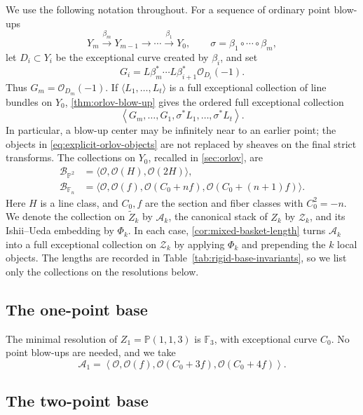 \documentclass[11pt]{article}
\theoremstyle{plain}
\theoremstyle{definition}
\theoremstyle{remark}
\newcommand{\Pp}{\mathbb P}
\newcommand{\F}{\mathbb F}
\newcommand{\OO}{\mathcal O}
\begin{document}
We use the following notation throughout. For a sequence of ordinary
point blow-ups
\[
Y_m\xrightarrow{\beta_m}Y_{m-1}\longrightarrow\cdots
\xrightarrow{\beta_1}Y_0,
\qquad \sigma=\beta_1\circ\cdots\circ\beta_m,
\]
let \(D_i\subset Y_i\) be the exceptional curve created by \(\beta_i\),
and set
\begin{equation}\label{eq:explicit-orlov-objects}
G_i=L\beta_m^*\cdots L\beta_{i+1}^*\OO_{D_i}(-1).
\end{equation}
Thus \(G_m=\OO_{D_m}(-1)\). If
\(\langle L_1,\ldots,L_t\rangle\) is a full exceptional collection of
line bundles on \(Y_0\), \cref{thm:orlov-blow-up} gives the ordered
full exceptional collection
\begin{equation}\label{eq:explicit-orlov-order}
\left\langle G_m,\ldots,G_1,
\sigma^*L_1,\ldots,\sigma^*L_t\right\rangle.
\end{equation}
In particular, a blow-up center may be infinitely near to an earlier point;
the objects in
\eqref{eq:explicit-orlov-objects} are not replaced by sheaves on the
final strict transforms. The collections on \(Y_0\), recalled in
\cref{sec:orlov}, are
\[
\begin{aligned}
\mathscr B_{\Pp^2}
 &=\langle\OO,\OO(H),\OO(2H)\rangle,\\
\mathscr B_{\F_n}
 &=\langle\OO,\OO(f),\OO(C_0+nf),\OO(C_0+(n+1)f)\rangle.
\end{aligned}
\]
Here \(H\) is a line class, and \(C_0,f\) are the section and fiber
classes with \(C_0^2=-n\). We denote the collection on
\(\widetilde Z_k\) by \(\mathscr A_k\), the canonical stack of
\(Z_k\) by \(\mathcal Z_k\), and its Ishii--Ueda embedding by
\(\Phi_k\). In each case, \cref{cor:mixed-basket-length} turns
\(\mathscr A_k\) into a full exceptional collection on \(\mathcal Z_k\) by applying \(\Phi_k\)
and prepending the \(k\) local objects. The lengths are recorded
in Table~\ref{tab:rigid-base-invariants}, so we list only the collections
on the resolutions below.

\subsection{The one-point base}
\label{app:explicit-base-one}

The minimal resolution of \(Z_1=\Pp(1,1,3)\) is \(\F_3\), with
exceptional curve \(C_0\). No point blow-ups are needed, and we take
\[
\mathscr A_1=
\left\langle\OO,\OO(f),\OO(C_0+3f),\OO(C_0+4f)\right\rangle.
\]

\subsection{The two-point base}
\label{app:explicit-base-two}
\end{document}
